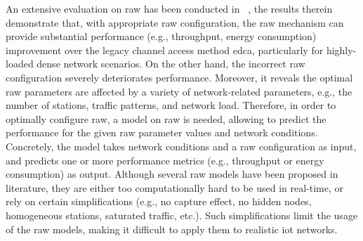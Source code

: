 

An extensive evaluation on \gls{raw} has been conducted in ~\cite{WoWMoM2016}, the results therein demonstrate that, with appropriate \gls{raw} configuration, the \gls{raw} mechanism can provide substantial performance (e.g., throughput, energy consumption) improvement over the legacy channel access method \gls{edca}, particularly for highly-loaded dense network scenarios. On the other hand, the incorrect \gls{raw} configuration severely deteriorates performance. Moreover, it reveals the optimal \gls{raw} parameters are affected by a variety of network-related parameters, e.g., the number of stations, traffic patterns, and network load. Therefore, in order to optimally configure \gls{raw}, a model on \gls{raw} is needed, allowing to predict the performance for the given \gls{raw} parameter values and network conditions. Concretely, the model takes network conditions and a \gls{raw} configuration as input, and predicts one or more performance metrics (e.g., throughput or energy consumption) as output. Although several \gls{raw} models have been proposed  in literature, they are either too computationally hard to be used in real-time, or rely on certain simplifications (e.g., no capture effect, no hidden nodes, homogeneous stations, saturated traffic, etc.). Such simplifications limit the usage of the \gls{raw} models, making it difficult to apply them to realistic \gls{iot} networks.

